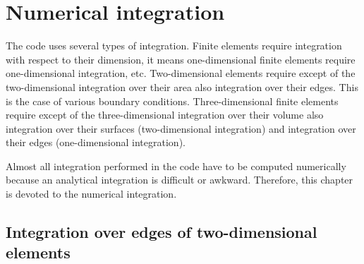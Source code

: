 \chapter{Numerical integration}

The code uses several types of integration. Finite elements require
integration with respect to their dimension, it means one-dimensional
finite elements require one-dimensional integration, etc. Two-dimensional
elements require except of the two-dimensional integration over their
area also integration over their edges. This is the case of various
boundary conditions. Three-dimensional finite elements require
except of the three-dimensional integration over their volume also
integration over their surfaces (two-dimensional integration)
and integration over their edges (one-dimensional integration).

Almost all integration performed in the code have to be computed
numerically because an analytical integration is difficult or
awkward. Therefore, this chapter is devoted to the numerical
integration.


\section{Integration over edges of two-dimensional elements}
